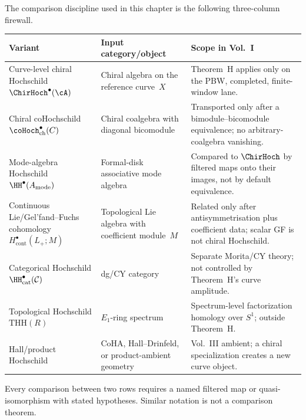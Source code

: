 \begin{remark}
\label{rem:hochschild-variant-firewall-table}
The comparison discipline used in this chapter is the following
three-column firewall.
\begin{center}
\renewcommand{\arraystretch}{1.18}
\begin{tabular}{@{}p{}p{}p{}@{}}
\toprule
Variant & Input category/object & Scope in Vol.~I \\
\midrule
Curve-level chiral Hochschild
$\ChirHoch^\bullet(\cA)$
& Chiral algebra on the reference curve~$X$
& Theorem~H applies only on the PBW, completed, finite-window lane. \\
Chiral coHochschild
$\coHoch^\bullet_{\mathrm{ch}}(C)$
& Chiral coalgebra with diagonal bicomodule
& Transported only after a bimodule--bicomodule equivalence; no arbitrary-coalgebra vanishing. \\
Mode-algebra Hochschild
$\HH^\bullet(A_{\mathrm{mode}})$
& Formal-disk associative mode algebra
& Compared to $\ChirHoch$ by filtered maps onto their images, not by default equivalence. \\
Continuous Lie/Gel'fand--Fuchs cohomology
$H^\bullet_{\mathrm{cont}}(L_+;M)$
& Topological Lie algebra with coefficient module~$M$
& Related only after antisymmetrisation plus coefficient data; scalar GF is not chiral Hochschild. \\
Categorical Hochschild
$\HH^\bullet_{\mathrm{cat}}(\mathcal C)$
& dg/CY category
& Separate Morita/CY theory; not controlled by Theorem~H's curve amplitude. \\
Topological Hochschild
$\mathrm{THH}(R)$
& $E_1$-ring spectrum
& Spectrum-level factorization homology over $S^1$; outside Theorem~H. \\
Hall/product Hochschild
& CoHA, Hall--Drinfeld, or product-ambient geometry
& Vol.~III ambient; a chiral specialization creates a new curve object. \\
\bottomrule
\end{tabular}
\end{center}
Every comparison between two rows requires a named filtered map or
quasi-isomorphism with stated hypotheses. Similar notation is not a
comparison theorem.
\end{remark}

